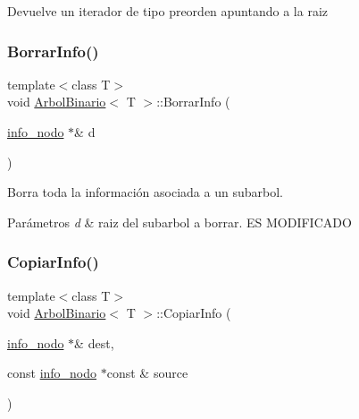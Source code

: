 \begin{DoxyReturn}{Devuelve}
un iterador de tipo preorden apuntando a la raiz 
\end{DoxyReturn}
\mbox{\label{classArbolBinario_a9a9320b7ec787b55a9fd65c041fea135}} 
\subsubsection{\texorpdfstring{Borrar\+Info()}{BorrarInfo()}}
{\footnotesize\ttfamily template$<$class T$>$ \\
void \hyperlink{classArbolBinario}{Arbol\+Binario}$<$ T $>$\+::Borrar\+Info (\begin{DoxyParamCaption}\item[{\hyperlink{structArbolBinario_1_1info__nodo}{info\+\_\+nodo} $\ast$\&}]{d }\end{DoxyParamCaption})\hspace{0.3cm}{\ttfamily [private]}}



Borra toda la información asociada a un subarbol. 


\begin{DoxyParams}{Parámetros}
{\em d} & raiz del subarbol a borrar. ES M\+O\+D\+I\+F\+I\+C\+A\+DO \\
\hline
\end{DoxyParams}
\mbox{\label{classArbolBinario_a2f4333678ab24a80ea88f05151d3b5ab}} 
\subsubsection{\texorpdfstring{Copiar\+Info()}{CopiarInfo()}}
{\footnotesize\ttfamily template$<$class T$>$ \\
void \hyperlink{classArbolBinario}{Arbol\+Binario}$<$ T $>$\+::Copiar\+Info (\begin{DoxyParamCaption}\item[{\hyperlink{structArbolBinario_1_1info__nodo}{info\+\_\+nodo} $\ast$\&}]{dest,  }\item[{const \hyperlink{structArbolBinario_1_1info__nodo}{info\+\_\+nodo} $\ast$const \&}]{source }\end{DoxyParamCaption})\hspace{0.3cm}{\ttfamily [private]}}



